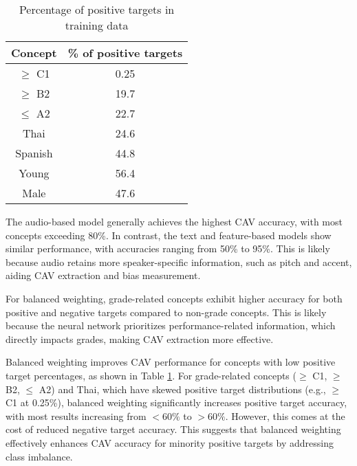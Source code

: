 \begin{table}[H]
    \centering
    \begin{tabular}{|c|c|}
        \hline
        \textbf{Concept} & \textbf{\% of positive targets} \\
        \hline
        $\geq$ C1        & 0.25                            \\
        $\geq$ B2        & 19.7                            \\
        $\leq$ A2        & 22.7                            \\ \hline
        Thai             & 24.6                            \\
        Spanish          & 44.8                            \\ \hline
        Young            & 56.4                            \\ \hline
        Male             & 47.6                            \\
        \hline
    \end{tabular}
    \caption{Percentage of positive targets in training data}
    \label{tab:pos_target}
\end{table}

The audio-based model generally achieves the highest CAV accuracy, with most concepts exceeding 80\%. In contrast, the text and feature-based models show similar performance, with accuracies ranging from 50\% to 95\%. This is likely because audio retains more speaker-specific information, such as pitch and accent, aiding CAV extraction and bias measurement.

For balanced weighting, grade-related concepts exhibit higher accuracy for both positive and negative targets compared to non-grade concepts. This is likely because the neural network prioritizes performance-related information, which directly impacts grades, making CAV extraction more effective.

Balanced weighting improves CAV performance for concepts with low positive target percentages, as shown in Table \ref{tab:pos_target}. For grade-related concepts ($\geq$ C1, $\geq$ B2, $\leq$ A2) and Thai, which have skewed positive target distributions (e.g., $\geq$ C1 at 0.25\%), balanced weighting significantly increases positive target accuracy, with most results increasing from $< 60\%$ to $> 60\%$. However, this comes at the cost of reduced negative target accuracy. This suggests that balanced weighting effectively enhances CAV accuracy for minority positive targets by addressing class imbalance.

